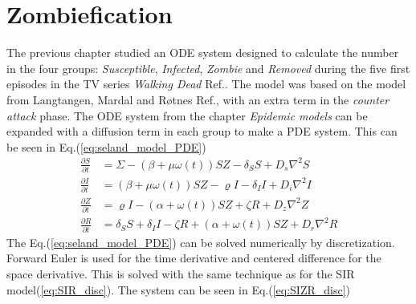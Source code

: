 \documentclass[%
twoside,                 %
final,                   %
chapterprefix=true,      %
open=right               %
10pt]{book}
\begin{document}
\section{Zombiefication}
The previous chapter studied an ODE system designed to calculate the number in the four groups: \emph{Susceptible}, \emph{Infected}, \emph{Zombie} and \emph{Removed} during the five first episodes in the TV series \emph{Walking Dead} Ref.\cite{walking_dead}. The model was based on the model from Langtangen, Mardal and Røtnes Ref.\cite{zombie-math}, with an extra term in the \emph{counter attack} phase. The ODE system from the chapter \emph{Epidemic models} can be expanded with a diffusion term in each group to make a PDE system. This can be seen in Eq.(\ref{eq:seland_model_PDE})  
\begin{equation} \label{eq:seland_model_PDE}
	\begin{aligned} 
	\frac{\partial S}{\partial t} &= \Sigma -(\beta+\mu \omega(t))SZ - \delta_SS +D_s\nabla^2 S \\
	\frac{\partial I}{\partial t} &= (\beta+\mu \omega(t))SZ - \varrho I - \delta_II+D_i\nabla^2 I \\
	\frac{\partial Z}{\partial t} &= \varrho I- (\alpha+\omega(t))SZ + \zeta R+D_z\nabla^2 Z \\
	\frac{\partial R}{\partial t} &= \delta_SS +\delta_II -\zeta R + (\alpha+\omega(t))SZ+D_r\nabla^2 R 
	\end{aligned}
\end{equation}
The Eq.(\ref{eq:seland_model_PDE}) can be solved numerically by discretization. Forward Euler is used for the time derivative and centered difference for the space derivative. This is solved with the same technique as for the SIR model(\ref{eq:SIR_disc}). The system can be seen in Eq.(\ref{eq:SIZR_disc})
\end{document}
